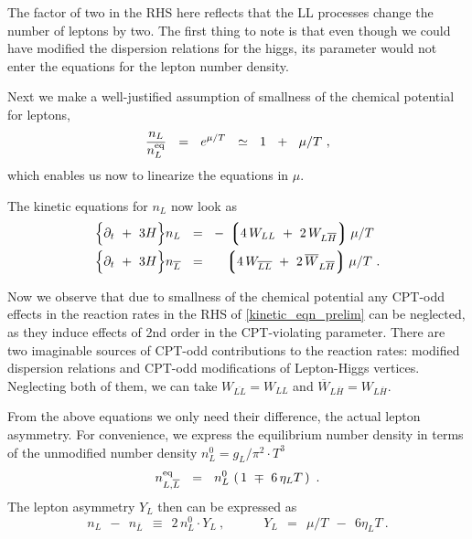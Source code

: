 \documentclass[12pt]{revtex4}
\newcommand{\eq}{{\rm eq}}
\newcommand{\lgr}{\left\lgroup}
\newcommand{\rgr}{\right\rgroup}
\newcommand{\p}{\partial}
\newcommand{\ov}{\overline}
\begin{document}
	The factor of two in the RHS here reflects that the LL processes
	change the number of leptons by two.
	The first thing to note is that even though we could have 
	modified the dispersion relations for the higgs, 
	its parameter would not enter the equations for the lepton number
	density.
	
	Next we make a well-justified assumption of 
	smallness of the chemical potential for leptons,
\[
	\frac{n_L}{n_L^\eq} ~~=~~ e^{\mu/T} ~~\simeq~~ 1 ~~+~~ \mu/T~,
\]
	which enables us now to linearize the equations in $ \mu $.

	The kinetic equations for $ n_L $ now look as
\begin{equation}
\label{kinetic_eqn_prelim}
\begin{split}
	\Bigl\{ \p_t ~+~ 3H \Bigr\}
		n_L ~~=~~ & 
	-\, \lgr 4\, W_{LL} ~+~ 2\, W_{L\ov{H}} \rgr  \mu/T \\
	\Bigl\{ \p_t ~+~ 3H \Bigr\} 
		n_{\ov{L}} ~~=~~ &
	\phantom{-\,}
	\lgr 4\, W_{\ov{LL}} ~+~ 2\, \ov{W}_{L\ov{H}} \rgr  \mu/T ~.
\end{split}
\end{equation}

	Now we observe that due to smallness of the chemical potential
	any CPT-odd effects in the reaction rates in the RHS of 
	\eqref{kinetic_eqn_prelim} can be neglected, as
	they induce effects of 2nd order in the CPT-violating parameter.
	There are two imaginable sources of CPT-odd contributions 
	to the reaction rates: modified dispersion relations and 
	CPT-odd modifications of Lepton-Higgs vertices. 
	Neglecting both of them, we can take
	$ W_{\ov{LL}} = W_{LL} $ and
	$ \ov{W}_{L\ov{H}} = W_{L\ov{H}} $.

	From the above equations we only need their difference, the actual
	lepton asymmetry.
	For convenience, we express the equilibrium number density in terms
	of the unmodified number density 
	$ n_L^0 = g_L/\pi^2 \cdot T^3 $
\[
	n_{L,\ov{L}}^\eq ~~=~~ n_L^0\, \left(\, 1 ~\mp~ 6\,\eta_L T \,\right)~.
\]
	The lepton asymmetry $ Y_L $ then can be expressed as
\[
	n_L ~~-~~ n_{\ov{L}} ~~\equiv~~ 2\, n_L^0 \cdot Y_L~,
	\qquad\quad Y_L ~~=~~ \mu/T ~~-~~ 6\eta_L T~.
\]
	
\end{document}
